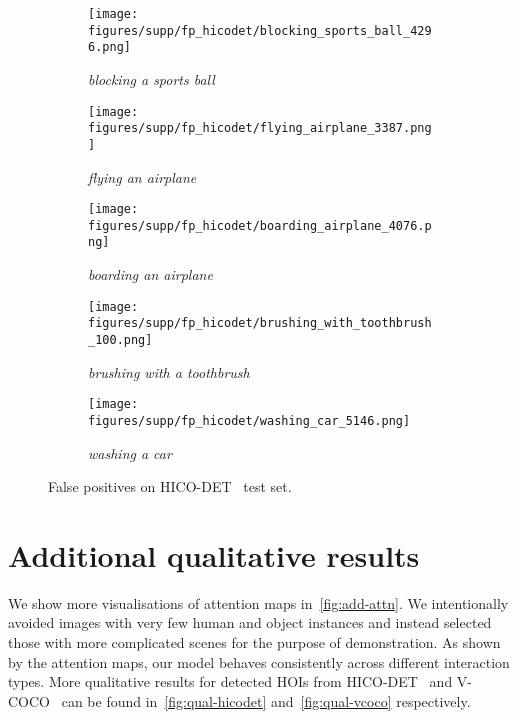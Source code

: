 \documentclass[10pt,twocolumn,letterpaper]{article}
\begin{document}
\begin{figure*}
    \centering
    \begin{subfigure}[t]{0.19\linewidth}
        \texttt{[image: figures/supp/fp\_hicodet/blocking\_sports\_ball\_4296.png]}
        \caption{\textit{blocking a sports ball}}
        \label{fig:fp-blocking-ball}
    \end{subfigure}
    \hspace{-3pt}
    \begin{subfigure}[t]{0.19\linewidth}
        \texttt{[image: figures/supp/fp\_hicodet/flying\_airplane\_3387.png]}
        \caption{\textit{flying an airplane}}
        \label{fig:fp-flying-airplane}
    \end{subfigure}
    \hspace{5pt}
    \begin{subfigure}[t]{0.19\linewidth}
        \texttt{[image: figures/supp/fp\_hicodet/boarding\_airplane\_4076.png]}
        \caption{\textit{boarding an airplane}}
        \label{fig:fp-boarding-airplane}
    \end{subfigure}
    \begin{subfigure}[t]{0.19\linewidth}
        \texttt{[image: figures/supp/fp\_hicodet/brushing\_with\_toothbrush\_100.png]}
        \caption{\textit{brushing with a toothbrush}}
        \label{fig:fp-brushing-toothbrushl}
    \end{subfigure}
    \hspace{5pt}
    \begin{subfigure}[t]{0.19\linewidth}
        \texttt{[image: figures/supp/fp\_hicodet/washing\_car\_5146.png]}
        \caption{\textit{washing a car}}
        \label{fig:fp-washing-car}
    \end{subfigure}
    \caption{False positives on HICO-DET~\cite{hicodet} test set.}
    \label{fig:fp}
    \vspace{-5pt}
\end{figure*}

\section{Additional qualitative results}
\label{app:qual}

We show more visualisations of attention maps in~\cref{fig:add-attn}. We intentionally avoided images with very few human and object instances and instead selected those with more complicated scenes for the purpose of demonstration. As shown by the attention maps, our model behaves consistently across different interaction types. More qualitative results for detected HOIs from HICO-DET~\cite{hicodet} and V-COCO~\cite{vcoco} can be found in~\cref{fig:qual-hicodet} and~\cref{fig:qual-vcoco} respectively.
\end{document}
